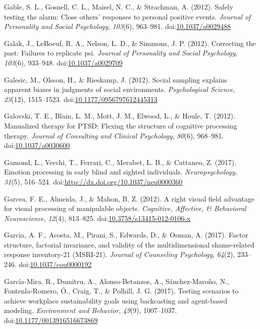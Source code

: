 \documentclass[english,man]{apa6}
\begin{document}
\hypertarget{ref-Gable2012}{}
Gable, S. L., Gosnell, C. L., Maisel, N. C., \& Strachman, A. (2012).
Safely testing the alarm: Close others' responses to personal positive
events. \emph{Journal of Personality and Social Psychology},
\emph{103}(6), 963--981.
doi:\href{https://doi.org/10.1037/a0029488}{10.1037/a0029488}

\hypertarget{ref-Galak2012}{}
Galak, J., LeBoeuf, R. A., Nelson, L. D., \& Simmons, J. P. (2012).
Correcting the past: Failures to replicate psi. \emph{Journal of
Personality and Social Psychology}, \emph{103}(6), 933--948.
doi:\href{https://doi.org/10.1037/a0029709}{10.1037/a0029709}

\hypertarget{ref-Galesic2012}{}
Galesic, M., Olsson, H., \& Rieskamp, J. (2012). Social sampling
explains apparent biases in judgments of social environments.
\emph{Psychological Science}, \emph{23}(12), 1515--1523.
doi:\href{https://doi.org/10.1177/0956797612445313}{10.1177/0956797612445313}

\hypertarget{ref-Galovski2012}{}
Galovski, T. E., Blain, L. M., Mott, J. M., Elwood, L., \& Houle, T.
(2012). Manualized therapy for PTSD: Flexing the structure of cognitive
processing therapy. \emph{Journal of Consulting and Clinical
Psychology}, \emph{80}(6), 968--981.
doi:\href{https://doi.org/10.1037/a0030600}{10.1037/a0030600}

\hypertarget{ref-Gamond2017}{}
Gamond, L., Vecchi, T., Ferrari, C., Merabet, L. B., \& Cattaneo, Z.
(2017). Emotion processing in early blind and sighted individuals.
\emph{Neuropsychology}, \emph{31}(5), 516--524.
doi:\href{https://doi.org/http://dx.doi.org/10.1037/neu0000360}{http://dx.doi.org/10.1037/neu0000360}

\hypertarget{ref-Garcea2012}{}
Garcea, F. E., Almeida, J., \& Mahon, B. Z. (2012). A right visual field
advantage for visual processing of manipulable objects. \emph{Cognitive,
Affective, \& Behavioral Neuroscience}, \emph{12}(4), 813--825.
doi:\href{https://doi.org/10.3758/s13415-012-0106-x}{10.3758/s13415-012-0106-x}

\hypertarget{ref-Garcia2017}{}
Garcia, A. F., Acosta, M., Pirani, S., Edwards, D., \& Osman, A. (2017).
Factor structure, factorial invariance, and validity of the
multidimensional shame-related response inventory-21 (MSRI-21).
\emph{Journal of Counseling Psychology}, \emph{64}(2), 233--246.
doi:\href{https://doi.org/10.1037/cou0000192}{10.1037/cou0000192}

\hypertarget{ref-Garcia-Mira2017}{}
García-Mira, R., Dumitru, A., Alonso-Betanzos, A., Sánchez-Maroño, N.,
Fontenla-Romero, Ó., Craig, T., \& Polhill, J. G. (2017). Testing
scenarios to achieve workplace sustainability goals using backcasting
and agent-based modeling. \emph{Environment and Behavior}, \emph{49}(9),
1007--1037.
doi:\href{https://doi.org/10.1177/0013916516673869}{10.1177/0013916516673869}
\end{document}
